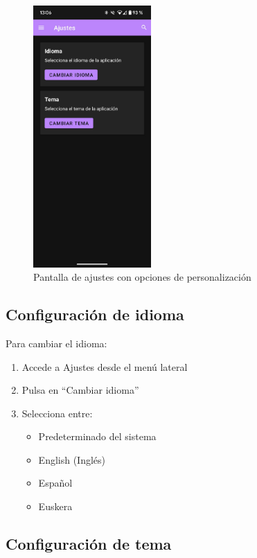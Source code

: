\documentclass[a4paper,12pt]{report}
\begin{document}
    \begin{figure}[H]
      \centering
      \includegraphics[width=0.4\textwidth]{.img/ajustes.png}
      \caption{Pantalla de ajustes con opciones de personalización}
      \label{fig:ajustes}
    \end{figure}
    
    \subsection{Configuración de idioma}
    
    Para cambiar el idioma:
    \begin{enumerate}
      \item Accede a Ajustes desde el menú lateral
      \item Pulsa en ``Cambiar idioma''
      \item Selecciona entre:
      \begin{itemize}
        \item Predeterminado del sistema
        \item English (Inglés)
        \item Español
        \item Euskera
      \end{itemize}
    \end{enumerate}
    
    \subsection{Configuración de tema}
    
\end{document}
